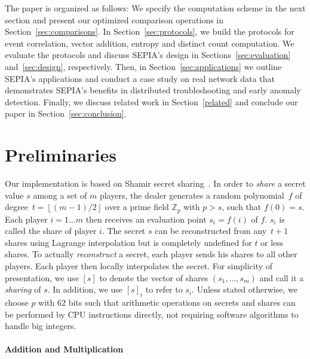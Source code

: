\documentclass[letterpaper,11pt,onecolumn,titlepage]{article}
\begin{document}
The paper is organized as follows: We specify the computation scheme
in the next section and present our optimized comparison operations in
Section~\ref{sec:comparisons}.  In Section~\ref{sec:protocols}, we
build the protocols for event correlation, vector addition, entropy
and distinct count computation.  We evaluate the protocols and discuss
SEPIA's design in Sections~\ref{sec:evaluation} and~\ref{sec:design},
respectively. Then, in Section~\ref{sec:applications} we outline
SEPIA's applications and conduct a case study on real network data
that demonstrates SEPIA's benefits in distributed troubleshooting and
early anomaly detection. Finally, we discuss related work in
Section~\ref{related} and conclude our paper in
Section~\ref{sec:conclusion}.

\section{Preliminaries}
\label{sec:preliminaries}

Our implementation is based on Shamir secret
sharing~\cite{shamir1979ss}.  In order to \emph{share} a secret value $s$
among a set of $m$ players, the dealer generates a random
polynomial~$f$ of degree~$t=\left\lfloor (m-1)/2 \right\rfloor$ over
a prime field $\mathbb{Z}_p$ with $p>s$, such that $f(0)=s$.  
Each player $i=1\ldots m$ then receives an evaluation
point $s_i=f(i)$ of $f$. $s_i$ is called the share of player $i$.
The secret $s$ can be reconstructed from any~$t+1$
shares using Lagrange interpolation but is completely undefined for
$t$ or less shares. To actually \emph{reconstruct} a secret, each 
player sends his shares to all other players. Each player
then locally interpolates the secret.
For simplicity of presentation, we 
use $[s]$ to denote the vector of shares $(s_1, \ldots, s_m)$ and call it a \emph{sharing} of $s$. 
In addition, we use $[s]_i$ to refer to $s_i$.
Unless stated otherwise, we choose $p$ with 62 bits such that arithmetic operations
on secrets and shares can be performed by CPU instructions directly,
not requiring software algorithms to handle big integers.  

\paragraph{Addition and Multiplication} 
\end{document}

